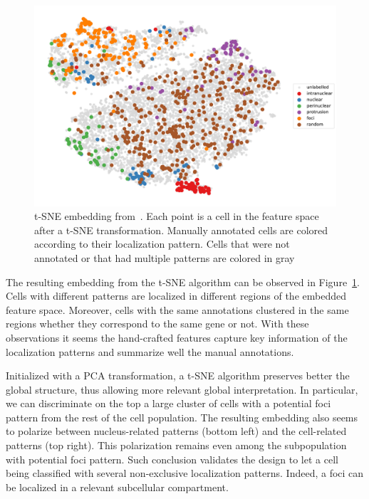 \begin{figure}[h]
    \centering
    \includegraphics[width=\textwidth]{figures/chapter5/tsne_annotation_legend}
    \caption{t-SNE embedding from~\cite{CHOUAIB_2020}.
	Each point is a cell in the feature space after a t-SNE transformation.
	Manually annotated cells are colored according to their localization pattern.
	Cells that were not annotated or that had multiple patterns are colored in gray}
    \label{fig:tsne_annotation_racha}
\end{figure}

The resulting embedding from the \ac{t-SNE} algorithm can be observed in Figure~\ref{fig:tsne_annotation_racha}.
Cells with different patterns are localized in different regions of the embedded feature space.
Moreover, cells with the same annotations clustered in the same regions whether they correspond to the same gene or not.
With these observations it seems the hand-crafted features capture key information of the localization patterns and summarize well the manual annotations.

Initialized with a PCA transformation, a \ac{t-SNE} algorithm preserves better the global structure, thus allowing more relevant global interpretation.
In particular, we can discriminate on the top a large cluster of cells with a potential foci pattern from the rest of the cell population.
The resulting embedding also seems to polarize between nucleus-related patterns (bottom left) and the cell-related patterns (top right).
This polarization remains even among the subpopulation with potential foci pattern.
Such conclusion validates the design to let a cell being classified with several non-exclusive localization patterns.
Indeed, a foci can be localized in a relevant subcellular compartment.

